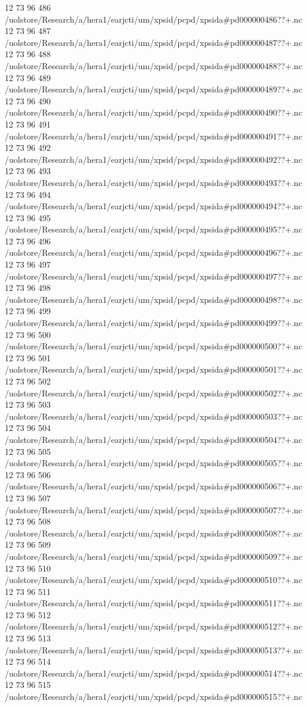 12 73 96
486
/uolstore/Research/a/hera1/earjcti/um/xpsid/pcpd/xpsida#pd000000486??+.nc
12 73 96
487
/uolstore/Research/a/hera1/earjcti/um/xpsid/pcpd/xpsida#pd000000487??+.nc
12 73 96
488
/uolstore/Research/a/hera1/earjcti/um/xpsid/pcpd/xpsida#pd000000488??+.nc
12 73 96
489
/uolstore/Research/a/hera1/earjcti/um/xpsid/pcpd/xpsida#pd000000489??+.nc
12 73 96
490
/uolstore/Research/a/hera1/earjcti/um/xpsid/pcpd/xpsida#pd000000490??+.nc
12 73 96
491
/uolstore/Research/a/hera1/earjcti/um/xpsid/pcpd/xpsida#pd000000491??+.nc
12 73 96
492
/uolstore/Research/a/hera1/earjcti/um/xpsid/pcpd/xpsida#pd000000492??+.nc
12 73 96
493
/uolstore/Research/a/hera1/earjcti/um/xpsid/pcpd/xpsida#pd000000493??+.nc
12 73 96
494
/uolstore/Research/a/hera1/earjcti/um/xpsid/pcpd/xpsida#pd000000494??+.nc
12 73 96
495
/uolstore/Research/a/hera1/earjcti/um/xpsid/pcpd/xpsida#pd000000495??+.nc
12 73 96
496
/uolstore/Research/a/hera1/earjcti/um/xpsid/pcpd/xpsida#pd000000496??+.nc
12 73 96
497
/uolstore/Research/a/hera1/earjcti/um/xpsid/pcpd/xpsida#pd000000497??+.nc
12 73 96
498
/uolstore/Research/a/hera1/earjcti/um/xpsid/pcpd/xpsida#pd000000498??+.nc
12 73 96
499
/uolstore/Research/a/hera1/earjcti/um/xpsid/pcpd/xpsida#pd000000499??+.nc
12 73 96
500
/uolstore/Research/a/hera1/earjcti/um/xpsid/pcpd/xpsida#pd000000500??+.nc
12 73 96
501
/uolstore/Research/a/hera1/earjcti/um/xpsid/pcpd/xpsida#pd000000501??+.nc
12 73 96
502
/uolstore/Research/a/hera1/earjcti/um/xpsid/pcpd/xpsida#pd000000502??+.nc
12 73 96
503
/uolstore/Research/a/hera1/earjcti/um/xpsid/pcpd/xpsida#pd000000503??+.nc
12 73 96
504
/uolstore/Research/a/hera1/earjcti/um/xpsid/pcpd/xpsida#pd000000504??+.nc
12 73 96
505
/uolstore/Research/a/hera1/earjcti/um/xpsid/pcpd/xpsida#pd000000505??+.nc
12 73 96
506
/uolstore/Research/a/hera1/earjcti/um/xpsid/pcpd/xpsida#pd000000506??+.nc
12 73 96
507
/uolstore/Research/a/hera1/earjcti/um/xpsid/pcpd/xpsida#pd000000507??+.nc
12 73 96
508
/uolstore/Research/a/hera1/earjcti/um/xpsid/pcpd/xpsida#pd000000508??+.nc
12 73 96
509
/uolstore/Research/a/hera1/earjcti/um/xpsid/pcpd/xpsida#pd000000509??+.nc
12 73 96
510
/uolstore/Research/a/hera1/earjcti/um/xpsid/pcpd/xpsida#pd000000510??+.nc
12 73 96
511
/uolstore/Research/a/hera1/earjcti/um/xpsid/pcpd/xpsida#pd000000511??+.nc
12 73 96
512
/uolstore/Research/a/hera1/earjcti/um/xpsid/pcpd/xpsida#pd000000512??+.nc
12 73 96
513
/uolstore/Research/a/hera1/earjcti/um/xpsid/pcpd/xpsida#pd000000513??+.nc
12 73 96
514
/uolstore/Research/a/hera1/earjcti/um/xpsid/pcpd/xpsida#pd000000514??+.nc
12 73 96
515
/uolstore/Research/a/hera1/earjcti/um/xpsid/pcpd/xpsida#pd000000515??+.nc
